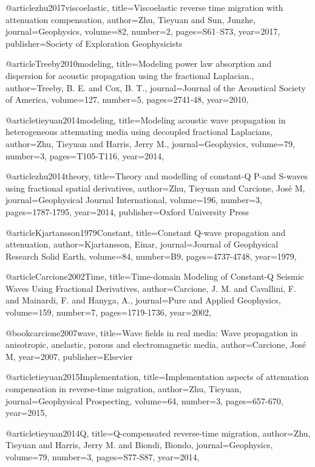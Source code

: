 {@article{zhu2017viscoelastic,
  title={Viscoelastic reverse time migration with attenuation compensation},
  author={Zhu, Tieyuan and Sun, Junzhe},
  journal={Geophysics},
  volume={82},
  number={2},
  pages={S61--S73},
  year={2017},
  publisher={Society of Exploration Geophysicists}
}


@article{Treeby2010modeling,
  title={Modeling power law absorption and dispersion for acoustic propagation using the fractional Laplacian.},
  author={Treeby, B. E. and Cox, B. T.},
  journal={Journal of the Acoustical Society of America},
  volume={127},
  number={5},
  pages={2741-48},
  year={2010},
}

@article{tieyuan2014modeling,
  title={Modeling acoustic wave propagation in heterogeneous attenuating media using decoupled fractional Laplacians},
  author={Zhu, Tieyuan and Harris, Jerry M.},
  journal={Geophysics},
  volume={79},
  number={3},
  pages={T105-T116},
  year={2014},
}

@article{zhu2014theory,
  title={Theory and modelling of constant-{Q} {P}-and {S}-waves using fractional spatial derivatives},
  author={Zhu, Tieyuan and Carcione, Jos{\'e} M},
  journal={Geophysical Journal International},
  volume={196},
  number={3},
  pages={1787-1795},
  year={2014},
  publisher={Oxford University Press}
}


@article{Kjartansson1979Constant,
  title={Constant {Q}-wave propagation and attenuation},
  author={Kjartansson, Einar},
  journal={Journal of Geophysical Research Solid Earth},
  volume={84},
  number={B9},
  pages={4737-4748},
  year={1979},
}

@article{Carcione2002Time,
  title={Time-domain Modeling of Constant-{Q} Seismic Waves Using Fractional Derivatives},
  author={Carcione, J. M. and Cavallini, F. and Mainardi, F. and Hanyga, A.},
  journal={Pure and Applied Geophysics},
  volume={159},
  number={7},
  pages={1719-1736},
  year={2002},
}

@book{carcione2007wave,
  title={Wave fields in real media: Wave propagation in anisotropic, anelastic, porous and electromagnetic media},
  author={Carcione, Jos{\'e} M},
  year={2007},
  publisher={Elsevier}
}

@article{tieyuan2015Implementation,
  title={Implementation aspects of attenuation compensation in reverse‐time migration},
  author={Zhu, Tieyuan},
  journal={Geophysical Prospecting},
  volume={64},
  number={3},
  pages={657-670},
  year={2015},
}

@article{tieyuan2014Q,
  title={Q-compensated reverse-time migration},
  author={Zhu, Tieyuan and Harris, Jerry M. and Biondi, Biondo},
  journal={Geophysics},
  volume={79},
  number={3},
  pages={S77-S87},
  year={2014},
}

}
